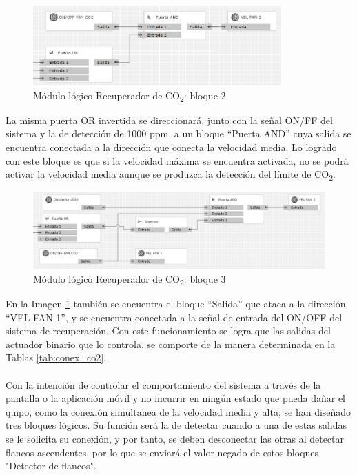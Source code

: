 \begin{figure}[H]
\centering
\includegraphics[width=0.85\textwidth]{figures/log_co2_b2.png}   
\caption{Módulo lógico Recuperador de CO\textsubscript{2}: bloque 2}
\label{fig:log_co2_b2}
\end{figure}
La misma puerta OR invertida se direccionará,  junto con la señal ON/FF del sistema y la de detección de 1000 ppm, a un bloque “Puerta AND” cuya salida se encuentra conectada a la dirección que conecta la velocidad media. Lo logrado con este bloque es que si la velocidad máxima se encuentra activada, no se podrá activar la velocidad media aunque se produzca la detección del límite de CO\textsubscript{2}.
\begin{figure}[H]
\centering
\includegraphics[width=1.15\textwidth]{figures/log_co2_b3.png}   
\caption{Módulo lógico Recuperador de CO\textsubscript{2}: bloque 3}
\label{fig:log_co2_b3}
\end{figure}
En la Imagen \ref{fig:log_co2_b2} también se encuentra el bloque “Salida” que ataca a la dirección “VEL FAN 1”, y se encuentra conectada a la señal de entrada del ON/OFF del sistema de recuperación. Con este funcionamiento se logra que las salidas del actuador binario que lo controla, se comporte de la manera determinada en la Tablas \ref{tab:conex_co2}.\\\\
Con la intención de controlar el comportamiento del sistema a través de la pantalla o la aplicación móvil y no incurrir en ningún estado que pueda dañar el quipo, como la conexión simultanea de la velocidad media y alta, se han diseñado tres bloques lógicos. Su función será la de detectar cuando a una de estas salidas se le solicita su conexión, y por tanto, se deben desconectar las otras al detectar flancos ascendentes, por lo que se enviará el valor negado de estos bloques "Detector de flancos".
